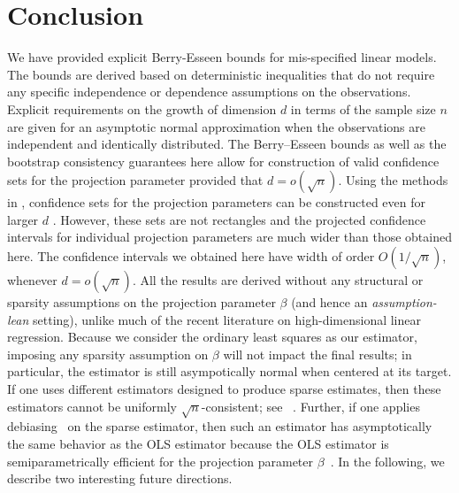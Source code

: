 \documentclass{article}
\begin{document}
\section{Conclusion}
\label{section::conclusion}
We have provided explicit Berry-Esseen bounds
for mis-specified linear models. The bounds are
derived based on deterministic inequalities that do not
require any specific independence or dependence assumptions
on the observations.
Explicit requirements on the growth of dimension $d$
in terms of the sample size $n$ are given for an asymptotic
normal approximation when the observations are independent
and identically distributed.
The Berry--Esseen bounds as well as the bootstrap consistency guarantees here allow for construction of valid confidence sets
for the projection parameter provided that $d = o(\sqrt{n})$.
Using the methods in
\cite{kuchibhotla2018valid}, confidence sets for the projection parameters can be constructed even for larger $d$ .
However, these sets are not rectangles and the projected
confidence intervals for individual projection parameters
are much wider than those obtained here. The confidence
intervals we obtained here have width of order $O(1/\sqrt{n})$,
whenever $d = o(\sqrt{n})$.
All the results are derived without any structural or sparsity assumptions on the projection parameter $\beta$ (and hence an \emph{assumption-lean} setting), unlike much of the recent literature on high-dimensional linear regression. Because we consider the ordinary least squares as our estimator, imposing any sparsity assumption on $\beta$ will not impact the final results; in particular, the estimator is still asympotically normal when centered at its target. If one uses different estimators designed to produce sparse estimates, then these estimators cannot be uniformly $\sqrt{n}$-consistent; see ~\cite{potscher2009confidence}. Further, if one applies debiasing~\citep{javanmard2014confidence,vandegeer2014asymptotically,zhang2014confidence} on the sparse estimator, then such an estimator has asymptotically the same behavior as the OLS estimator because the OLS estimator is semiparametrically efficient for the projection parameter $\beta$~\cite{Levit76}.
In the following, we describe two interesting future directions.
\end{document}
